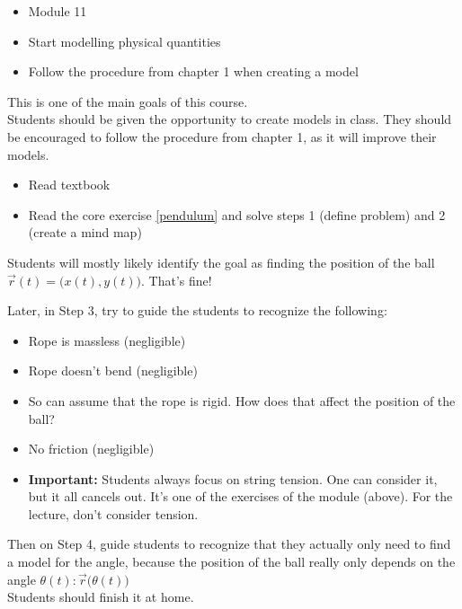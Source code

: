 \begin{lesson}

	\begin{itemize}
		\item Module 11
	\end{itemize}

	\begin{itemize}
		\item Start modelling physical quantities
		\item Follow the procedure from chapter 1 when creating a model
	\end{itemize}
	

This is one of the main goals of this course. \\

Students should be given the opportunity to create models in class. They should be encouraged to follow the procedure from chapter 1, as it will improve their models.


\begin{itemize}
	\item Read textbook
	\item Read the core exercise \ref{pendulum} and solve steps 1 (define problem) and 2 (create a mind map)
\end{itemize}

\end{lesson}






\begin{annotation}
	\begin{goals}
		Students will mostly likely identify the goal as finding the position of the ball $\vec{r}(t) = \big( x(t) , y(t) \big)$. That's fine!
		
		Later, in Step 3, try to guide the students to recognize the following:
		\begin{itemize}
			\item Rope is massless (negligible)
			\item Rope doesn't bend (negligible)
			\item So can assume that the rope is rigid. How does that affect the position of the ball?
			\item No friction (negligible)
			\item \textbf{Important:} Students always focus on string tension. One can consider it, but it all cancels out. It's one of the exercises of the module (above). For the lecture, don't consider tension.
		\end{itemize}
		
		Then on Step 4, guide students to recognize that they actually only need to find a model for the angle, because the position of the ball really only depends on the angle $\theta(t): \vec{r}\big(\theta(t)\big)$ \\

		Students should finish it at home.				
	\end{goals}
\end{annotation}

